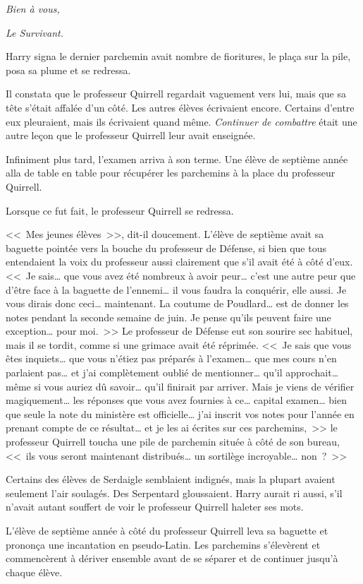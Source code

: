 \emph{Bien à vous,}

\emph{Le Survivant.}

Harry signa le dernier parchemin avait nombre de fioritures, le plaça sur la pile, posa sa plume et se redressa.

Il constata que le professeur Quirrell regardait vaguement vers lui, mais que sa tête s'était affalée d'un côté. Les autres élèves écrivaient encore. Certains d'entre eux pleuraient, mais ils écrivaient quand même. \emph{Continuer de combattre} était une autre leçon que le professeur Quirrell leur avait enseignée.

Infiniment plus tard, l'examen arriva à son terme. Une élève de septième année alla de table en table pour récupérer les parchemins à la place du professeur Quirrell.

Lorsque ce fut fait, le professeur Quirrell se redressa.

<<~Mes jeunes élèves~>>, dit-il doucement. L'élève de septième avait sa baguette pointée vers la bouche du professeur de Défense, si bien que tous entendaient la voix du professeur aussi clairement que s'il avait été à côté d'eux. <<~Je sais… que vous avez été nombreux à avoir peur… c'est une autre peur que d'être face à la baguette de l'ennemi… il vous faudra la conquérir, elle aussi. Je vous dirais donc ceci… maintenant. La coutume de Poudlard… est de donner les notes pendant la seconde semaine de juin. Je pense qu'ils peuvent faire une exception… pour moi.~>> Le professeur de Défense eut son sourire sec habituel, mais il se tordit, comme si une grimace avait été réprimée. <<~Je sais que vous êtes inquiets… que vous n'étiez pas préparés à l'examen… que mes cours n'en parlaient pas… et j'ai complètement oublié de mentionner… qu'il approchait… même si vous auriez dû savoir… qu'il finirait par arriver. Mais je viens de vérifier magiquement… les réponses que vous avez fournies à ce… capital examen… bien que seule la note du ministère est officielle… j'ai inscrit vos notes pour l'année en prenant compte de ce résultat… et je les ai écrites sur ces parchemins,~>> le professeur Quirrell toucha une pile de parchemin située à côté de son bureau, <<~ils vous seront maintenant distribués… un sortilège incroyable… non~?~>>

Certains des élèves de Serdaigle semblaient indignés, mais la plupart avaient seulement l'air soulagés. Des Serpentard gloussaient. Harry aurait ri aussi, s'il n'avait autant souffert de voir le professeur Quirrell haleter ses mots.

L'élève de septième année à côté du professeur Quirrell leva sa baguette et prononça une incantation en pseudo-Latin. Les parchemins s'élevèrent et commencèrent à dériver ensemble avant de se séparer et de continuer jusqu'à chaque élève.

